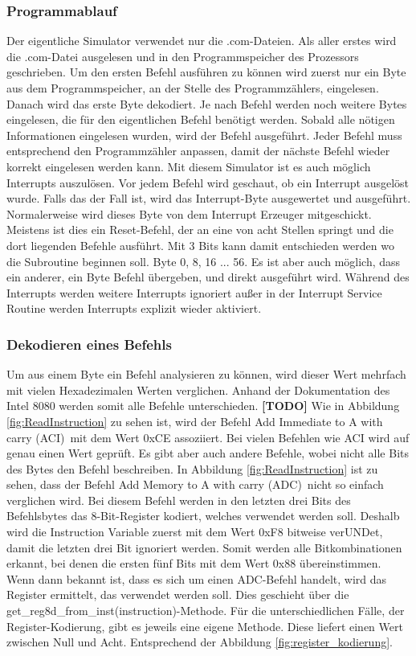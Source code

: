 \documentclass[12pt]{article}
\newcommand{\imgSpaceBefore}{\vspace{10pt}}
\begin{document}
\subsubsection{Programmablauf}
Der eigentliche Simulator verwendet nur die .com-Dateien. Als aller erstes wird die .com-Datei ausgelesen und in den Programmspeicher des Prozessors geschrieben. Um den ersten Befehl ausführen zu können wird zuerst nur ein Byte aus dem Programmspeicher, an der Stelle des Programmzählers, eingelesen. Danach wird das erste Byte dekodiert. 
Je nach Befehl werden noch weitere Bytes eingelesen, die für den eigentlichen Befehl benötigt werden. Sobald alle nötigen Informationen eingelesen wurden, wird der Befehl ausgeführt. Jeder Befehl muss entsprechend den Programmzähler anpassen, damit der nächste Befehl wieder korrekt eingelesen werden kann. Mit diesem Simulator ist es auch möglich Interrupts auszulösen. Vor jedem Befehl wird geschaut, ob ein Interrupt ausgelöst wurde. Falls das der Fall ist, wird das Interrupt-Byte ausgewertet und ausgeführt. Normalerweise wird dieses Byte von dem Interrupt Erzeuger mitgeschickt. Meistens ist dies ein Reset-Befehl, der an eine von acht Stellen springt und die dort liegenden Befehle ausführt. Mit 3 Bits kann damit entschieden werden wo die Subroutine beginnen soll. Byte 0, 8, 16 ... 56. Es ist aber auch möglich, dass ein anderer, ein Byte Befehl übergeben, und direkt ausgeführt wird. Während des Interrupts werden weitere Interrupts ignoriert außer in der Interrupt Service Routine werden Interrupts explizit wieder aktiviert.


\subsubsection{Dekodieren eines Befehls}
\noindent
Um aus einem Byte ein Befehl analysieren zu können, wird dieser Wert mehrfach mit vielen Hexadezimalen Werten verglichen. Anhand der Dokumentation des Intel 8080 werden somit alle Befehle unterschieden. 
\textbf{[TODO]} Wie in  Abbildung \ref{fig:ReadInstruction} zu sehen ist, wird der Befehl \glqq Add Immediate to A with carry (ACI)\grqq\ mit dem Wert 0xCE assoziiert.  
Bei vielen Befehlen wie ACI wird auf genau einen Wert geprüft. Es gibt aber auch andere Befehle, wobei nicht alle Bits des Bytes den Befehl beschreiben. In Abbildung \ref{fig:ReadInstruction} ist zu sehen, dass der Befehl \glqq Add Memory to A with carry (ADC)\grqq\ nicht so einfach verglichen wird. Bei diesem Befehl werden in den letzten drei Bits des Befehlsbytes das 8-Bit-Register kodiert, welches verwendet werden soll. Deshalb wird die Instruction Variable zuerst mit dem Wert 0xF8 bitweise verUNDet, damit die letzten drei Bit ignoriert werden. Somit werden alle Bitkombinationen erkannt, bei denen die ersten fünf Bits mit dem Wert 0x88 übereinstimmen. Wenn dann bekannt ist, dass es sich um einen ADC-Befehl handelt, wird das Register ermittelt, das verwendet werden soll. Dies geschieht über die get\_reg8d\_from\_inst(instruction)-Methode. Für die unterschiedlichen Fälle, der Register-Kodierung, gibt es jeweils eine eigene Methode. Diese liefert einen Wert zwischen Null und Acht. Entsprechend der Abbildung \ref{fig:register_kodierung}.\imgSpaceBefore
\end{document}
